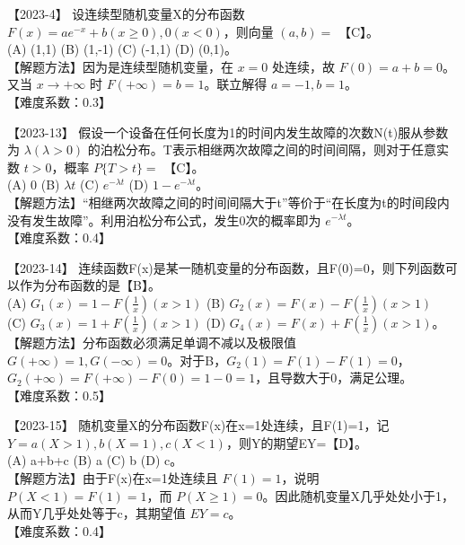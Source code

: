 \documentclass[zihao=4, a4paper, fontset=mac]{ctexart}
\begin{document}
\par\vspace{\baselineskip}

【2023-4】 设连续型随机变量X的分布函数 $F(x) = ae^{-x}+b (x\ge0), 0 (x<0)$，则向量 $(a,b)=$ 【C】。\\
(A) (1,1) \quad (B) (1,-1) \quad (C) (-1,1) \quad (D) (0,1)。\\
【解题方法】因为是连续型随机变量，在 $x=0$ 处连续，故 $F(0)=a+b=0$。又当 $x\rightarrow +\infty$ 时 $F(+\infty)=b=1$。联立解得 $a=-1, b=1$。\\
【难度系数：0.3】

\par\vspace{\baselineskip}

【2023-13】 假设一个设备在任何长度为1的时间内发生故障的次数N(t)服从参数为 $\lambda (\lambda>0)$ 的泊松分布。T表示相继两次故障之间的时间间隔，则对于任意实数 $t>0$，概率 $P\{T>t\}=$ 【C】。\\
(A) 0 \quad (B) $\lambda t$ \quad (C) $e^{-\lambda t}$ \quad (D) $1-e^{-\lambda t}$。\\
【解题方法】“相继两次故障之间的时间间隔大于t”等价于“在长度为t的时间段内没有发生故障”。利用泊松分布公式，发生0次的概率即为 $e^{-\lambda t}$。\\
【难度系数：0.4】

\par\vspace{\baselineskip}

【2023-14】 连续函数F(x)是某一随机变量的分布函数，且F(0)=0，则下列函数可以作为分布函数的是【B】。\\
(A) $G_1(x)=1-F(\frac{1}{x}) (x>1)$ \quad (B) $G_2(x)=F(x)-F(\frac{1}{x}) (x>1)$ \\
(C) $G_3(x)=1+F(\frac{1}{x}) (x>1)$ \quad (D) $G_4(x)=F(x)+F(\frac{1}{x}) (x>1)$。\\
【解题方法】分布函数必须满足单调不减以及极限值 $G(+\infty)=1, G(-\infty)=0$。对于B，$G_2(1)=F(1)-F(1)=0$，$G_2(+\infty)=F(+\infty)-F(0)=1-0=1$，且导数大于0，满足公理。\\
【难度系数：0.5】

\par\vspace{\baselineskip}

【2023-15】 随机变量X的分布函数F(x)在x=1处连续，且F(1)=1，记 $Y = a (X>1), b (X=1), c (X<1)$，则Y的期望EY=【D】。\\
(A) a+b+c \quad (B) a \quad (C) b \quad (D) c。\\
【解题方法】由于F(x)在x=1处连续且 $F(1)=1$，说明 $P(X<1)=F(1)=1$，而 $P(X\ge1)=0$。因此随机变量X几乎处处小于1，从而Y几乎处处等于c，其期望值 $EY=c$。\\
【难度系数：0.4】
\end{document}
